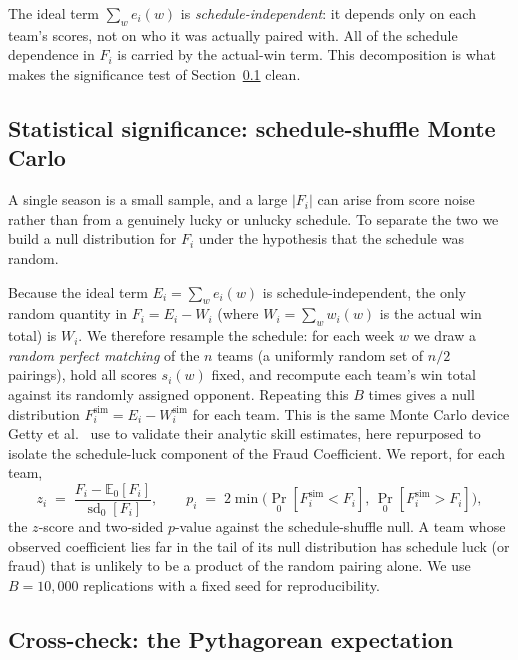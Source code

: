 \documentclass[11pt]{article}
\newcommand{\E}{\mathbb{E}}
\newcommand{\std}{\operatorname{sd}}
\begin{document}
The ideal term $\sum_w e_i(w)$ is \emph{schedule-independent}: it depends only
on each team's scores, not on who it was actually paired with. All of the
schedule dependence in $F_i$ is carried by the actual-win term. This
decomposition is what makes the significance test of
Section~\ref{sec:montecarlo} clean.

\subsection{Statistical significance: schedule-shuffle Monte Carlo}
\label{sec:montecarlo}

A single season is a small sample, and a large $|F_i|$ can arise from score
noise rather than from a genuinely lucky or unlucky schedule. To separate the
two we build a null distribution for $F_i$ under the hypothesis that the
schedule was random.

Because the ideal term $E_i=\sum_w e_i(w)$ is schedule-independent, the only
random quantity in $F_i=E_i-W_i$ (where $W_i=\sum_w w_i(w)$ is the actual win
total) is $W_i$. We therefore resample the schedule: for each week $w$ we draw
a \emph{random perfect matching} of the $n$ teams (a uniformly random set of
$n/2$ pairings), hold all scores $s_i(w)$ fixed, and recompute each team's win
total against its randomly assigned opponent. Repeating this $B$ times gives a
null distribution $F_i^{\mathrm{sim}}=E_i-W_i^{\mathrm{sim}}$ for each team.
This is the same Monte Carlo device Getty et al.~\cite{getty2018} use to
validate their analytic skill estimates, here repurposed to isolate the
schedule-luck component of the Fraud Coefficient. We report, for each team,
\begin{equation}
z_i \;=\; \frac{F_i - \E_0[F_i]}{\std_0[F_i]},
\qquad
p_i \;=\; 2\min\bigl(\Pr_0[F_i^{\mathrm{sim}}<F_i],\,
\Pr_0[F_i^{\mathrm{sim}}>F_i]\bigr),
\end{equation}
the $z$-score and two-sided $p$-value against the schedule-shuffle null. A
team whose observed coefficient lies far in the tail of its null distribution
has schedule luck (or fraud) that is unlikely to be a product of the random
pairing alone. We use $B=10{,}000$ replications with a fixed seed for
reproducibility.

\subsection{Cross-check: the Pythagorean expectation}
\label{sec:pythagorean}
\end{document}
